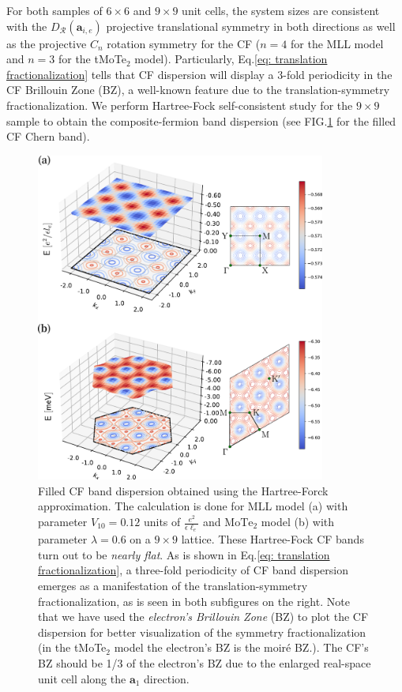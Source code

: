 For both samples of $6\times 6$ and $9\times9$ unit cells, the system sizes are consistent with the $D_{\mathcal R}(\mathbf a_{i,e})$ projective translational symmetry in both directions as well as the projective $C_n$ rotation symmetry for the CF ($n=4$ for the MLL model and $n=3$ for the tMoTe$_2$ model). Particularly, Eq.\eqref{eq: translation fractionalization} tells that CF dispersion will display a $3$-fold periodicity in the CF Brillouin Zone (BZ), a well-known feature due to the translation-symmetry fractionalization. We perform Hartree-Fock self-consistent study for the $9\times9$ sample to obtain the composite-fermion band dispersion (see FIG.\ref{fig: CF dispersion} for the filled CF Chern band).
\begin{figure}[!htp]
    \centering
    \includegraphics[width=0.85\textwidth]{figures/FCI/combined_cf_translation_fractionalization.pdf}
    \caption{Filled CF band dispersion obtained using the Hartree-Forck approximation. The calculation is done for MLL model (a) with parameter $V_{10}=0.12$ units of $\frac{e^2}{\epsilon\ell_e}$ and $\mathrm{MoTe_2}$ model (b) with parameter $\lambda=0.6$ on a $9\times9$ lattice. These Hartree-Fock CF bands turn out to be \emph{nearly flat}. As is shown in Eq.\eqref{eq: translation fractionalization}, a three-fold periodicity of CF band dispersion emerges as a manifestation of the translation-symmetry fractionalization, as is seen in both subfigures on the right. Note that we have used the \emph{electron's Brillouin Zone} (BZ) to plot the CF dispersion for better visualization of the symmetry fractionalization (in the tMoTe$_2$ model the electron's BZ is the moiré BZ.). The CF's BZ should be 1/3 of the electron's BZ due to the enlarged real-space unit cell along the $\mathbf a_1$ direction.}
    \label{fig: CF dispersion}
\end{figure}

